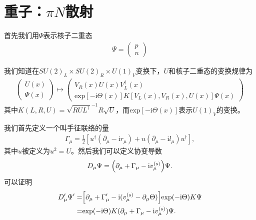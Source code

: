 \documentclass[aps,tightenlines,16pt]{ctexart}
\numberwithin{equation}{section}
\newcommand{\mL}{\mathcal{L}}
\begin{document}
\newpage
\section{重子：$\pi N$散射}
首先我们用$\Psi$表示核子二重态
\begin{align}
   \Psi = \begin{pmatrix}
      p\\
      n
   \end{pmatrix}
\end{align}

我们知道在$SU(2)_L\times SU(2)_R\times U(1)_V$变换下，$U$和核子二重态的变换规律为
\begin{align}
   \begin{pmatrix}
      U(x)\\
      \Psi(x)
   \end{pmatrix}
   \mapsto
   \begin{pmatrix}
      V_R(x)U(x)V_L^{\dagger}(x)\\
      \text{exp}[-\mbox{i}\Theta(x)]K[V_L(x),V_R(x),U(x)]\Psi(x)
   \end{pmatrix}
\end{align}
其中$K(L,R,U)=\sqrt{RUL^{\dagger}}^{-1}R\sqrt{U}$，而$\text{exp}[-\mbox{i}\Theta(x)]$表示$U(1)_V$的变换。

我们首先定义一个叫手征联络的量
\begin{align}
   \Gamma_{\mu}=\frac{1}{2}[u^{\dagger}(\partial_{\mu}-\mbox{i}r_{\mu})+u(\partial_{\mu}-\mbox{i}l_{\mu})u^{\dagger}],
\end{align}
其中$u$被定义为$u^2 =U$。然后我们可以定义协变导数
\begin{align}
   D_{\mu}\Psi = \Bigl(\partial_{\mu}+\Gamma_{\mu}-\mbox{i}v_{\mu}^{(s)}\Bigr)\Psi.
\end{align}
可以证明
\begin{align}
   \begin{aligned}
      D_{\mu}^{\prime}\Psi^{\prime} =& \Bigl[\partial_{\mu}+\Gamma_{\mu}^{\prime} - \mbox{i}(v_{\mu}^{(s)}-\partial_{\mu}\Theta)\Bigr]\text{exp}(-\mbox{i}\Theta)K\Psi\\
      =&\text{exp}(-\mbox{i}\Theta)K(\partial_{\mu}+\Gamma_{\mu}-\mbox{i}v_{\mu}^{(s)})\Psi.
   \end{aligned}
\end{align}
\end{document}
